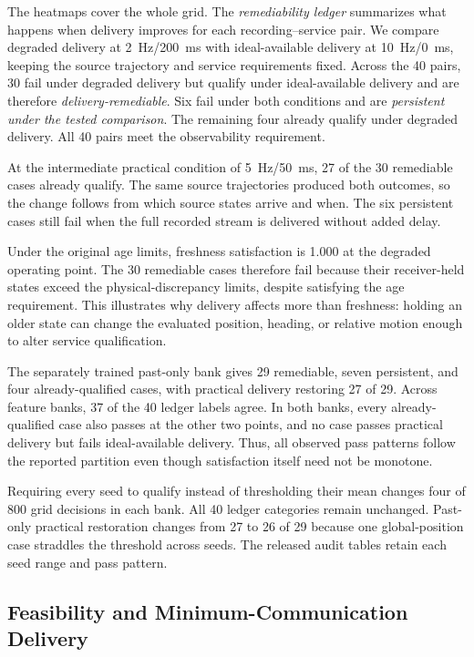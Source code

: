 \documentclass[journal]{IEEEtran}
\newcommand{\new}[1]{#1}
\newcommand{\rev}[1]{#1}
\begin{document}
The heatmaps cover the whole grid. The \emph{remediability ledger}
summarizes what happens when delivery improves for each
recording--service pair. We compare
degraded delivery at 2~Hz/200~ms with ideal-available delivery at
10~Hz/0~ms, keeping the source trajectory and service requirements
fixed. Across the 40 pairs, 30 fail under degraded delivery but qualify
under ideal-available delivery and are therefore
\emph{delivery-remediable}. Six fail under both conditions and are
\emph{persistent under the tested comparison}. The remaining four
already qualify under degraded delivery. All 40 pairs meet the
observability requirement.

At the intermediate practical condition of 5~Hz/50~ms, 27 of the 30
remediable cases already qualify. The same source trajectories produced
both outcomes, so the change follows from which source states arrive
and when. The six persistent cases still fail when the full recorded
stream is delivered without added delay.

Under the original age limits, freshness satisfaction is 1.000 at
the degraded operating point. The 30 remediable cases therefore fail
because their receiver-held states exceed the physical-discrepancy
limits, despite satisfying the age requirement. This illustrates why
delivery affects more than freshness: holding an older state can
change the evaluated position, heading, or relative motion enough to
alter service qualification.

\rev{The separately trained past-only bank gives 29 remediable, seven
persistent, and four already-qualified cases, with practical delivery
restoring 27 of 29. Across feature banks, 37 of the 40 ledger labels
agree. In both banks, every already-qualified case also passes at the
other two points, and no case passes practical delivery but fails
ideal-available delivery. Thus, all observed pass patterns follow the
reported partition even though satisfaction itself need not be monotone.}

\rev{Requiring every seed to qualify instead of thresholding their mean
changes four of 800 grid decisions in each bank. All 40 ledger categories
remain unchanged. Past-only practical restoration changes from 27 to
26 of 29 because one global-position case straddles the threshold across
seeds. The released audit tables retain each seed range and pass pattern.}
\new{\subsection{Feasibility and Minimum-Communication Delivery}}
\label{subsec:delivery_feasibility}
\end{document}
